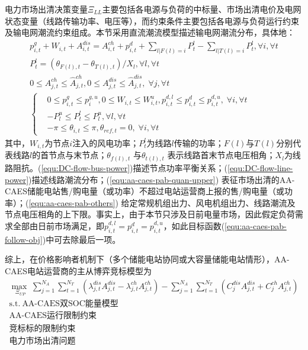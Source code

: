 电力市场出清决策变量${\Xi_{LL}}$主要包括各电源与负荷的中标量、市场出清电价及电网状态变量（线路传输功率、电压等），而约束条件主要包括各电源与负荷运行约束及输电网潮流约束组成\cite{CAES-DAM-Rui-18}。本节采用直流潮流模型描述输电网潮流分布\cite{MATPOWER}，具体地：
\begin{subequations}
\label{equ:DC-flow}
\begin{gather}
p_{i,t}^g + W_{i,t}^{} + A_{i,t}^{dis} = A_{i,t}^{ch} + p_{i,t}^d + \sum\limits_{l|F(l) = i} {P_t^l}  - \sum\limits_{l|T(l) = i} {P_t^l} ,\forall i,\forall t \label{equ:DC-flow-bus-power}\\
P_t^l = ({{\theta _{F(l),t}} - {\theta _{T(l),t}}})/{X_l},\forall l,\forall t \label{equ:DC-flow-line-power}\\
0 \le A_{j,t}^{ch} \le \hat A_{j,t}^{ch}, 0 \le A_{j,t}^{dis} \le \hat A_{j,t}^{dis},\;\forall j,\forall t \label{equ:aa-caes-pab-quan-upper}\\
\left\{\begin{aligned}
&0 \le p_{i,t}^g \le p_i^{g,u},0 \le W_{i,t}^{} \le W_{i,t}^u, p_{i,t}^{d,l} \le p_{i,t}^d \le p_{i,t}^{d,u},\;\forall i,\forall t\\
& - P_l^u \le P_t^l \le P_l^u,\forall l,\forall t\\
&  - \pi  \le {\theta _{i,t}} \le \pi ,{\theta _{ref,t}} = 0,\;\forall i,\forall t
\end{aligned}\right.\label{equ:aa-caes-pab-others}
\end{gather}
\end{subequations}
其中，$W_{i,t}$为节点$i$注入的风电功率；$P_t^l$为线路$l$传输的功率；$F(l)$与$T(l)$分别代表线路$l$的首节点与末节点；$\theta _{f(l),t}$ 与$\theta _{t(l),t}$ 表示线路首末节点电压相角；$X_l$为线路阻抗。(\ref{equ:DC-flow-bus-power})描述节点功率平衡关系；(\ref{equ:DC-flow-line-power})描述线路潮流分布；(\ref{equ:aa-caes-pab-quan-upper}) 表征市场出清的AA-CAES储能电站售/购电量（或功率）不超过电站运营商上报的售/购电量（或功率）；(\ref{equ:aa-caes-pab-others}) 给定常规机组出力、风电机组出力、线路潮流及节点电压相角的上下限。事实上，由于本节只涉及日前电量市场，因此假定负荷需求全部由日前市场满足，即$ p_{i,t}^{d,l}= p_{i,t}^d = p_{i,t}^{d,u}$，如此目标函数(\ref{equ:aa-caes-pab-follow-obj})中可去除最后一项。

综上，在价格影响者机制下（多个储能电站协同或大容量储能电站情形），AA-CAES电站运营商的主从博弈竞标模型为
\begin{subequations}
\label{equ:bid-model-price-marker}
\begin{gather}
\mathop {\max \;}\limits_{{\Xi _{UP}}} \sum\limits_{j = 1}^{{N_A}} {\sum\limits_{t = 1}^{{N_T}} {({\lambda _{j,t}^{dis}A_{j,t}^{dis} - \lambda _{j,t}^{ch}A_{j,t}^{ch}})} } - \sum\limits_{j = 1}^{{N_A}} {\sum\limits_{t = 1}^{{N_T}} {({C_j^{dis}A_{j,t}^{dis} + C_j^{ch}A_{j,t}^{ch}})}}\label{equ:bid-model-price-marker-obj}\\
\mbox{s.t.}~
\mbox{AA-CAES双SOC能量模型}\\
\mbox{AA-CAES运行限制约束}\\
\mbox{竞标标的限制约束}\\
\mbox{电力市场出清问题} 
\end{gather}
\end{subequations}


